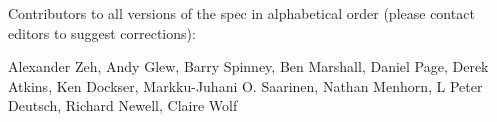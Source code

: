 
%
%

\noindent
Contributors to all versions of the spec in
alphabetical order (please contact editors to suggest
corrections):

Alexander Zeh,
Andy Glew,
Barry Spinney,
Ben Marshall,
Daniel Page,
Derek Atkins,
Ken Dockser,
Markku-Juhani O. Saarinen,
Nathan Menhorn,
L Peter Deutsch,
Richard Newell,
Claire Wolf

